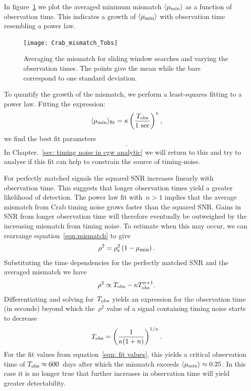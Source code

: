 \documentclass[../full_thesis/full_thesis.tex]{subfiles}
\newcommand{\thisdir}{../timing_noise_in_CGW}
\begin{document}
In figure~\ref{fig: mismatch Tobs} we plot the averaged minimum
mismatch $\langle\mu_{\mathrm{min}}\rangle$ as a function of observation time.
This indicates a growth of $\langle\mu_{\mathrm{min}}\rangle$ with observation time
resembling a power law.
\begin{figure}[ht]
\centering
\texttt{[image: Crab\_mismatch\_Tobs]}
\caption{Averaging the mismatch for sliding window searches and varying the
observation times. The points give the mean while the bars correspond to one
standard deviation.}
\label{fig: mismatch Tobs}
\end{figure}

To quantify the growth of the mismatch, we perform a least-squares fitting
to a power law. Fitting the expression:
\begin{equation}
\langle\mu_{\mathrm{min}}\rangle_{\textrm{fit}} = \kappa
                                   \left(\frac{T_{\textrm{obs}}}{1\textrm{ sec}}\right)^{n},
\end{equation}
we find the best fit parameters
\begin{align}
    .
    \label{eqn: fit values}
\end{align}
In Chapter.~\ref{sec: timing noise in cgw analytic} we will return to this
and try to analyse if this fit can help to constrain the source of timing-noise.

For perfectly matched signals the squared SNR
increases linearly \citep{Prix2009} with observation time.
This suggests that longer observation
times yield a greater likelihood of detection. The power law fit with~$n > 1$
implies that the average mismatch from
Crab timing noise grows faster than the squared SNR.
Gains in
SNR from longer observation time will therefore eventually be
outweighed by the increasing mismatch from timing noise.
To estimate when this may occur, we can rearrange equation~\eqref{eqn:mismatch}
to give
\begin{equation}
    \rho^{2} = \rho^{2}_{\mathrm{s}}\left(1 - \mu_{\mathrm{min}}\right).
\end{equation}
Substituting the time dependencies for the perfectly matched SNR and the
averaged mismatch we have
\begin{equation}
    \rho^{2} \propto T_{\textrm{obs}} - \kappa T_{\textrm{obs}}^{n+1}.
\end{equation}
Differentiating and solving for~$T_{\textrm{obs}}$ yields an expression for the
observation time (in seconds)
beyond which the~$\rho^{2}$ value of a signal containing timing
noise starts to decrease
\begin{equation}
T_{\textrm{obs}} = \left(\frac{1}{\kappa(1+n)}\right)^{1/n}.
\end{equation}
For the fit values from equation~\eqref{eqn: fit values}, this yields
a critical observation time of
$T_{\textrm{obs}}\approx 600$~days after which the mismatch exceeds
$\langle\mu_{\mathrm{min}}\rangle \approx 0.25$.
In this case it is no longer true that further increases in
observation time will yield greater detectability.
\end{document}
